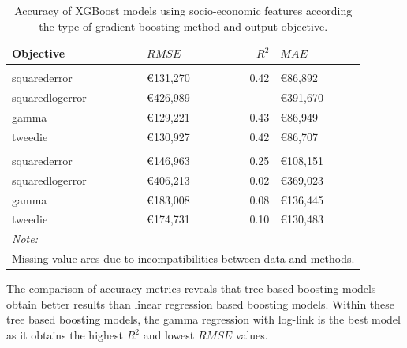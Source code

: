 \documentclass[conference,final,]{IEEEtran}
\begin{document}
\begin{table}[H]

\caption{\label{tab:census-model-comparison}Accuracy of XGBoost models using socio-economic features according the type of gradient boosting method and output objective.}
\centering
\fontsize{8}{10}\selectfont
\begin{tabular}[t]{llrl}
\toprule
Objective & $RMSE$ & $R^2$ & $MAE$\\
\midrule
\addlinespace[0.3em]
\multicolumn{4}{l}{\textbf{Tree based}}\\
\hspace{1em}squarederror & €131,270 & 0.42 & €86,892\\
\hspace{1em}squaredlogerror & €426,989 & - & €391,670\\
\hspace{1em}gamma & €129,221 & 0.43 & €86,949\\
\hspace{1em}tweedie & €130,927 & 0.42 & €86,707\\
\addlinespace[0.3em]
\multicolumn{4}{l}{\textbf{Linear regression based}}\\
\hspace{1em}squarederror & €146,963 & 0.25 & €108,151\\
\hspace{1em}squaredlogerror & €406,213 & 0.02 & €369,023\\
\hspace{1em}gamma & €183,008 & 0.08 & €136,445\\
\hspace{1em}tweedie & €174,731 & 0.10 & €130,483\\
\bottomrule
\multicolumn{4}{l}{\textit{Note: }}\\
\multicolumn{4}{l}{Missing value ares due to incompatibilities between data and methods.}\\
\end{tabular}
\end{table}

The comparison of accuracy metrics reveals that tree based boosting models obtain better results than linear regression based boosting models. Within these tree based boosting models, the gamma regression with log-link is the best model as it obtains the highest \(R^2\) and lowest \(RMSE\) values.
\end{document}
